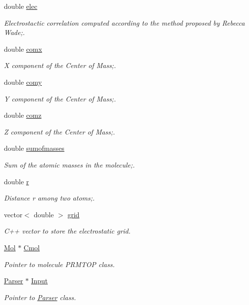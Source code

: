 \begin{DoxyCompactItemize}
double \hyperlink{classGrid_afbb458694097a88a996838a131f61ead}{elec}
\begin{DoxyCompactList}\small\item\em Electrostactic correlation computed according to the method proposed by Rebecca Wade;. \end{DoxyCompactList}\item 
double \hyperlink{classGrid_ac49fae4528db3bc897b5c99d6b5a5a1d}{comx}
\begin{DoxyCompactList}\small\item\em X component of the Center of Mass;. \end{DoxyCompactList}\item 
double \hyperlink{classGrid_a594a208bcfd831efadc544c051f62f30}{comy}
\begin{DoxyCompactList}\small\item\em Y component of the Center of Mass;. \end{DoxyCompactList}\item 
double \hyperlink{classGrid_a8cbad1d609a7592a19b065f7ad647f8a}{comz}
\begin{DoxyCompactList}\small\item\em Z component of the Center of Mass;. \end{DoxyCompactList}\item 
double \hyperlink{classGrid_a2c6ed23a2ebb4e4bc967228bfbab6480}{sumofmasses}
\begin{DoxyCompactList}\small\item\em Sum of the atomic masses in the molecule;. \end{DoxyCompactList}\item 
double \hyperlink{classGrid_a50100ef8f1e23ba090567bd460e779cb}{r}
\begin{DoxyCompactList}\small\item\em Distance {\itshape r\/} among two atoms;. \end{DoxyCompactList}\item 
vector$<$ double $>$ \hyperlink{classGrid_ac9dcc7447af2497822b6e6e22be45f7e}{grid}
\begin{DoxyCompactList}\small\item\em C++ vector to store the electrostatic grid. \end{DoxyCompactList}\item 
\hyperlink{classMol}{Mol} $\ast$ \hyperlink{classGrid_ab5087e114551f00fbb0d281b801d3dfc}{Cmol}
\begin{DoxyCompactList}\small\item\em Pointer to molecule PRMTOP class. \end{DoxyCompactList}\item 
\hyperlink{classParser}{Parser} $\ast$ \hyperlink{classGrid_aa9824cf9539971c3d32e92532c9c37be}{Input}
\begin{DoxyCompactList}\small\item\em Pointer to \hyperlink{classParser}{Parser} class. \end{DoxyCompactList}\end{DoxyCompactItemize}


